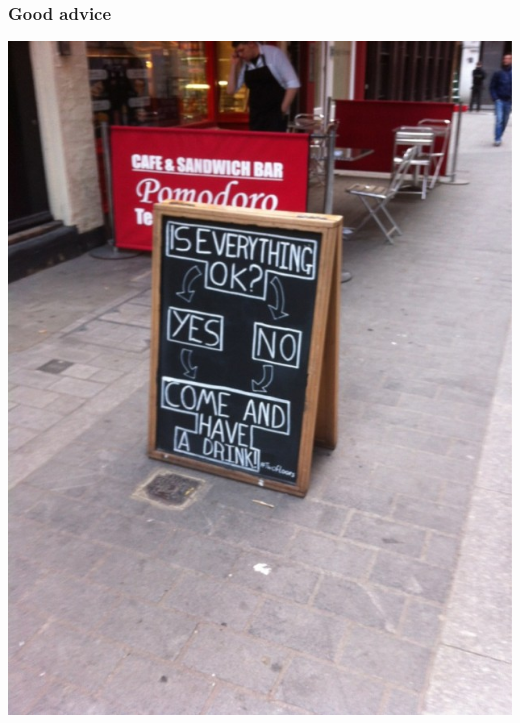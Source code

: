 \documentclass{beamer}
\begin{document}
\begin{frame}
  \frametitle{Good advice}
  \begin{center}
    \includegraphics[height = 0.8\textheight, keepaspectratio = true]{figure/pub_flow}
  \end{center}
\end{frame}
\end{document}
